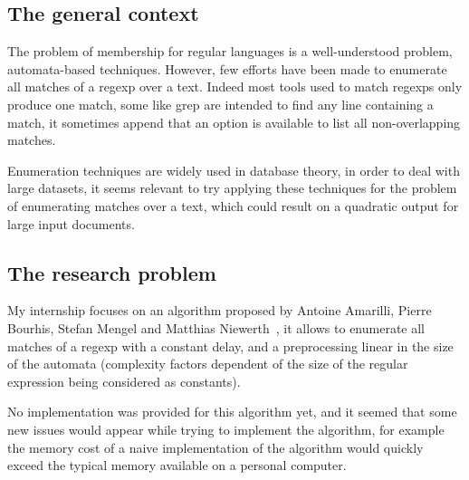 \subsection*{The general context}


  The problem of membership for regular languages is a well-understood problem,
  automata-based techniques. %
  However, few efforts have been made to enumerate all matches of a regexp over
  a text. Indeed most tools used to match regexps only produce one match, some
  like grep are intended to find any line containing a match, it sometimes
  append that an option is available to list all non-overlapping matches.

  Enumeration techniques are widely used in database theory, in order to deal
  with large datasets, it seems relevant to try applying these techniques for
  the problem of enumerating matches over a text, which could result on a
  quadratic output for large input documents.

\subsection*{The research problem}


  My internship focuses on an algorithm proposed by Antoine Amarilli, Pierre
  Bourhis, Stefan Mengel and Matthias Niewerth~\cite{ICDT19}, it allows to
  enumerate all matches of a regexp with a constant delay, and a preprocessing
  linear in the size of the automata (complexity factors dependent of the
  size of the regular expression being considered as constants).

  No implementation was provided for this algorithm yet, and it seemed that
  some new issues would appear while trying to implement the algorithm, for
  example the memory cost of a naive implementation of the algorithm would
  quickly exceed the typical memory available on a personal computer.

